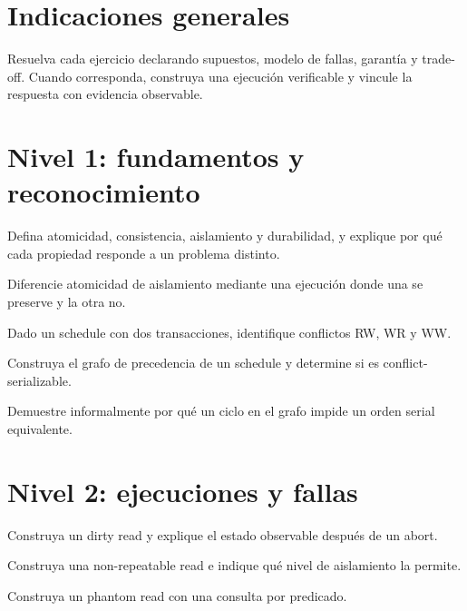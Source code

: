 \documentclass[variant=guia,cover=institutional,mode=screen]{ua-engineering-v6-article}
\author{\UAProfessor}
\date{\UADate}
\begin{document}
\section{Indicaciones generales}
Resuelva cada ejercicio declarando supuestos, modelo de fallas, garantía y trade-off. Cuando corresponda, construya una ejecución verificable y vincule la respuesta con evidencia observable.

\section{Nivel 1: fundamentos y reconocimiento}
\begin{uaexercise}
Defina atomicidad, consistencia, aislamiento y durabilidad, y explique por qué cada propiedad responde a un problema distinto.
\end{uaexercise}

\begin{uaexercise}
Diferencie atomicidad de aislamiento mediante una ejecución donde una se preserve y la otra no.
\end{uaexercise}

\begin{uaexercise}
Dado un schedule con dos transacciones, identifique conflictos RW, WR y WW.
\end{uaexercise}

\begin{uaexercise}
Construya el grafo de precedencia de un schedule y determine si es conflict-serializable.
\end{uaexercise}

\begin{uaexercise}
Demuestre informalmente por qué un ciclo en el grafo impide un orden serial equivalente.
\end{uaexercise}


\section{Nivel 2: ejecuciones y fallas}
\begin{uaexercise}
Construya un dirty read y explique el estado observable después de un abort.
\end{uaexercise}

\begin{uaexercise}
Construya una non-repeatable read e indique qué nivel de aislamiento la permite.
\end{uaexercise}

\begin{uaexercise}
Construya un phantom read con una consulta por predicado.
\end{uaexercise}
\end{document}
